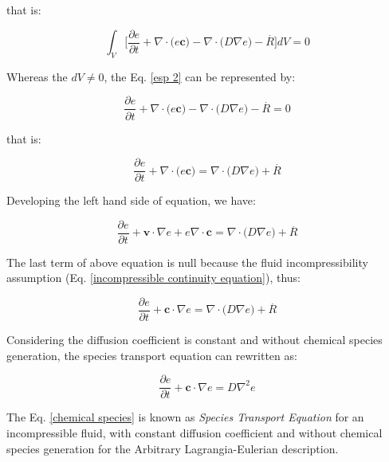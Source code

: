 \medskip
\noindent
that is:

\begin{equation} \label{esp 2}
 \int_{V} \Bigg[ \frac{\partial e}{\partial t}
 + 
 \nabla \cdot \big( e \textbf{c} \big)
 -
 \nabla \cdot \big( D \nabla e \big)
 -
 \overset{.}{R} \Bigg] dV = 0
\end{equation}



\medskip
\noindent
Whereas the $dV \neq 0$,
the Eq. \ref{esp 2} can be represented by:

\begin{equation}
 \frac{\partial e}{\partial t}
 + 
 \nabla \cdot \big( e \textbf{c} \big)
 -
 \nabla \cdot \big( D \nabla e \big)
 -
 \overset{.}{R} = 0
\end{equation}



\medskip
\noindent
that is:

\begin{equation}
 \frac{\partial e}{\partial t}
 +
 \nabla \cdot \big( e \textbf{c} \big)
 =
 \nabla \cdot \big( D \nabla e \big)
 +
 \overset{.}{R}
\end{equation}

\medskip
\noindent
Developing the left hand side of equation, we have:

\begin{equation}
 \frac{\partial e}{\partial t}
 +
 \textbf{v} \cdot \nabla e
 + 
 e \nabla \cdot \textbf{c}
 =
 \nabla \cdot \big( D \nabla e \big)
 +
 \overset{.}{R}
\end{equation}

\medskip
The last term of above equation is null because the
fluid incompressibility assumption
(Eq. \ref{incompressible continuity equation}),
thus:

\begin{equation}
 \frac{\partial e}{\partial t}
 +
 \textbf{c} \cdot \nabla e
 =
 \nabla \cdot \big( D \nabla e \big)
 +
 \overset{.}{R}
\end{equation}

\newpage
Considering the diffusion coefficient
is constant and without chemical species
generation,
the species transport equation can rewritten as:

\begin{equation} \label{chemical species}
 \frac{\partial e}{\partial t}
 +
 \textbf{c} \cdot \nabla e
 =
 D \nabla^{2} e
\end{equation}

\medskip
\noindent
The Eq. \ref{chemical species} is known as
\textit{Species Transport Equation}
for an incompressible fluid, with constant diffusion coefficient
and without chemical species generation for the
Arbitrary Lagrangia-Eulerian description.
